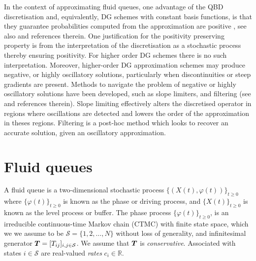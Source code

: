 
In the context of approximating fluid queues, one advantage of the QBD discretisation and, equivalently, DG schemes with constant basis functions, is that they guarantee probabilities computed from the approximation are positive \citep[Section 3.3]{koltai2011}, see also \citep{nodalDGBook} and references therein. One justification for the positivity preserving property is from the interpretation of the discretisation as a stochastic process thereby ensuring positivity. For higher order DG schemes there is no such interpretation. Moreover, higher-order DG approximation schemes may produce negative, or highly oscillatory solutions, particularly when discontinuities or steep gradients are present. Methods to navigate the problem of negative or highly oscillatory solutions have been developed, such as slope limiters, and filtering (see \citep[Section 6.5]{nodalDGBook} and references therein). Slope limiting effectively alters the discretised operator in regions where oscillations are detected and lowers the order of the approximation in theses regions. Filtering is a post-hoc method which looks to recover an accurate solution, given an oscillatory approximation. 

\section{Fluid queues}
A fluid queue is a two-dimensional stochastic process \(\{(X(t),\varphi(t))\}_{t\geq0}\) where \(\{\varphi(t)\}_{t\geq0}\) is known as the phase or driving process, and \(\{X(t)\}_{t\geq0}\) is known as the level process or buffer. The phase process \(\{\varphi(t)\}_{t\geq0}\), is an irreducible continuous-time Markov chain (CTMC) with finite state space, which we we assume to be \(\mathcal S=\{1,2,\dots,N\}\) without loss of generality, and infinitesimal generator \(\boldsymbol T= [T_{ij}]_{i,j\in\mathcal S}\). We assume that \(\boldsymbol T\) is \emph{conservative}. Associated with states \(i\in\mathcal S\) are real-valued \emph{rates} \(c_i\in\mathbb R\). 

